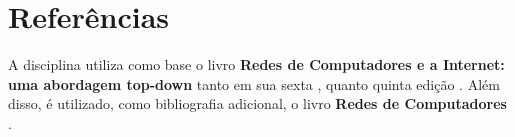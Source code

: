 \documentclass{article}
\begin{document}
\section{Referências}
A disciplina utiliza como base o livro \textbf{Redes de Computadores e a Internet: uma abordagem top-down} tanto em sua sexta \cite{kurose6}, quanto quinta edição \cite{kurose5}. Além disso, é utilizado, como bibliografia adicional, o livro \textbf{Redes de Computadores} \cite{tanenbaum}.



\end{document}
